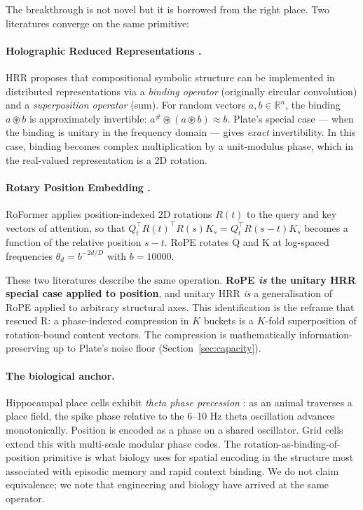 \documentclass[10pt, twocolumn, a4paper]{article}
\newcommand{\R}{\mathbb{R}}
\begin{document}
The breakthrough is not novel but it is borrowed from the right place. Two literatures converge on the same primitive:

\paragraph{Holographic Reduced Representations \cite{plate1995hrr, kanerva2009hyperdim}.} HRR proposes that compositional symbolic structure can be implemented in distributed representations via a \emph{binding operator} (originally circular convolution) and a \emph{superposition operator} (sum). For random vectors $a, b \in \R^n$, the binding $a \circledast b$ is approximately invertible: $a^{\#} \circledast (a \circledast b) \approx b$. Plate's special case --- when the binding is unitary in the frequency domain --- gives \emph{exact} invertibility. In this case, binding becomes complex multiplication by a unit-modulus phase, which in the real-valued representation is a 2D rotation.

\paragraph{Rotary Position Embedding \cite{su2021roformer}.} RoFormer applies position-indexed 2D rotations $R(t)$ to the query and key vectors of attention, so that $Q_t^\top R(t)^\top R(s) K_s = Q_t^\top R(s-t) K_s$ becomes a function of the relative position $s-t$. RoPE rotates Q and K at log-spaced frequencies $\theta_d = b^{-2d/D}$ with $b = 10000$.

These two literatures describe the same operation. \textbf{RoPE \emph{is} the unitary HRR special case applied to position}, and unitary HRR \emph{is} a generalisation of RoPE applied to arbitrary structural axes. This identification is the reframe that rescued R: a phase-indexed compression in $K$ buckets is a $K$-fold superposition of rotation-bound content vectors. The compression is mathematically information-preserving up to Plate's noise floor (Section~\ref{sec:capacity}).

\paragraph{The biological anchor.} Hippocampal place cells exhibit \emph{theta phase precession} \cite{burgess2011models}: as an animal traverses a place field, the spike phase relative to the 6--10 Hz theta oscillation advances monotonically. Position is encoded as a phase on a shared oscillator. Grid cells extend this with multi-scale modular phase codes. The rotation-as-binding-of-position primitive is what biology uses for spatial encoding in the structure most associated with episodic memory and rapid context binding. We do not claim equivalence; we note that engineering and biology have arrived at the same operator.
\end{document}
